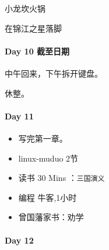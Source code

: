 \documentclass[UTF8,a4paper,8pt]{ctexart}
\begin{document}
	 	 小龙坎火锅
	 	 
	 	 在锦江之星落脚
	 	 
 	 \paragraph{Day 10  截至日期    		\quad     }
	 	 中午回来，下午拆开键盘。
	 	 
	 	 休整。
 	 \paragraph{Day 11      \quad     }
	 	 \begin{itemize}[itemindent = 1em]
	 	 	\renewcommand\labelitemi{\makebox[0pt][l]{$\square$}\raisebox{.15ex}{\hspace{0.1em}$\checkmark$}}		

	 	 	\item    写完第一章。
	 	 	\item    linux-muduo 2节
	 	 	
	 	 	
	 	 	\renewcommand\labelitemi{\makebox[0pt][l]{$\square$}\hspace{1em}}
	 	 	\item   读书  30 Mins	：\verb|三国演义|
	 	 	\item   编程  牛客,1小时
	 	 	\item   曾国藩家书：劝学
	 	 \end{itemize}
 	 \paragraph{Day 12      \quad     }
\end{document}
